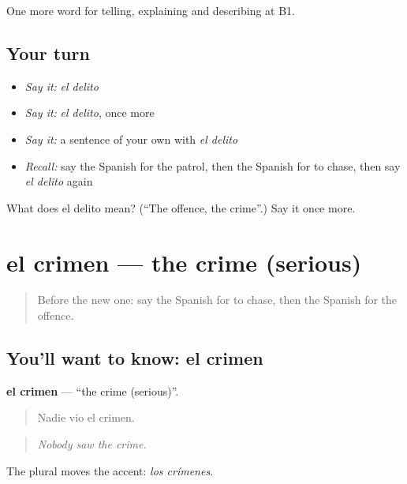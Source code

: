 \begin{grammarlens}[title={What you've built}]
One more word for telling, explaining and describing at B1.
\end{grammarlens}

\subsection*{Your turn}
\begin{itemize}
\raggedright
  \item \emph{Say it:} \emph{el delito}
  \item \emph{Say it:} \emph{el delito}, once more
  \item \emph{Say it:} a sentence of your own with \emph{el delito}
  \item \emph{Recall:} say the Spanish for the patrol, then the Spanish for to chase, then say \emph{el delito} again
\end{itemize}

\begin{tcolorbox}[breakable,colback=teal!4,colframe=teal!35!black,title={Before you move on}]
What does el delito mean? (\textquotedblleft{}The offence, the crime\textquotedblright{}.) Say it once more.
\end{tcolorbox}
\section[el crimen]{el crimen — the crime (serious)}

\label{lesson:ES-C520-crimen}



\begin{quote}
Before the new one: say the Spanish for to chase, then the Spanish for the offence.
\end{quote}

\subsection*{You'll want to know: el crimen}
\textbf{el crimen} — \textquotedblleft{}the crime (serious)\textquotedblright{}.

\begin{quote}
Nadie vio el crimen.
\end{quote}

\begin{quote}
\emph{Nobody saw the crime.}
\end{quote}

The plural moves the accent: \emph{los crímenes}.

